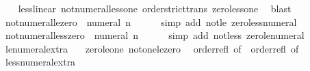\begin{isabellebody}
%
\isadelimproof
\ \ %
\endisadelimproof
%
\isatagproof
{}\isamarkupfalse%
\ less{\isacharunderscore}{\kern0pt}linear\ not{\isacharunderscore}{\kern0pt}numeral{\isacharunderscore}{\kern0pt}less{\isacharunderscore}{\kern0pt}one\ order{\isachardot}{\kern0pt}strict{\isacharunderscore}{\kern0pt}trans\ zero{\isacharunderscore}{\kern0pt}less{\isacharunderscore}{\kern0pt}one\ \isamarkupfalse%
\ blast%
\endisatagproof
{\isafoldproof}%
%
\isadelimproof
\isanewline
%
\endisadelimproof
\isanewline
{}\isamarkupfalse%
\ not{\isacharunderscore}{\kern0pt}numeral{\isacharunderscore}{\kern0pt}le{\isacharunderscore}{\kern0pt}zero{\isacharcolon}{\kern0pt}\ {\isachardoublequoteopen}{\isasymnot}\ numeral\ n\ {\isasymle}\ {}{\isachardoublequoteclose}\isanewline
%
\isadelimproof
\ \ %
\endisadelimproof
%
\isatagproof
{}\isamarkupfalse%
\ {\isacharparenleft}{\kern0pt}simp\ add{\isacharcolon}{\kern0pt}\ not{\isacharunderscore}{\kern0pt}le\ zero{\isacharunderscore}{\kern0pt}less{\isacharunderscore}{\kern0pt}numeral{\isacharparenright}{\kern0pt}%
\endisatagproof
{\isafoldproof}%
%
\isadelimproof
\isanewline
%
\endisadelimproof
\isanewline
{}\isamarkupfalse%
\ not{\isacharunderscore}{\kern0pt}numeral{\isacharunderscore}{\kern0pt}less{\isacharunderscore}{\kern0pt}zero{\isacharcolon}{\kern0pt}\ {\isachardoublequoteopen}{\isasymnot}\ numeral\ n\ {\isacharless}{\kern0pt}\ {}{\isachardoublequoteclose}\isanewline
%
\isadelimproof
\ \ %
\endisadelimproof
%
\isatagproof
{}\isamarkupfalse%
\ {\isacharparenleft}{\kern0pt}simp\ add{\isacharcolon}{\kern0pt}\ not{\isacharunderscore}{\kern0pt}less\ zero{\isacharunderscore}{\kern0pt}le{\isacharunderscore}{\kern0pt}numeral{\isacharparenright}{\kern0pt}%
\endisatagproof
{\isafoldproof}%
%
\isadelimproof
\isanewline
%
\endisadelimproof
\isanewline
{}\isamarkupfalse%
\ le{\isacharunderscore}{\kern0pt}numeral{\isacharunderscore}{\kern0pt}extra\ {\isacharequal}{\kern0pt}\isanewline
\ \ zero{\isacharunderscore}{\kern0pt}le{\isacharunderscore}{\kern0pt}one\ not{\isacharunderscore}{\kern0pt}one{\isacharunderscore}{\kern0pt}le{\isacharunderscore}{\kern0pt}zero\isanewline
\ \ order{\isacharunderscore}{\kern0pt}refl\ {\isacharbrackleft}{\kern0pt}of\ {}{\isacharbrackright}{\kern0pt}\ order{\isacharunderscore}{\kern0pt}refl\ {\isacharbrackleft}{\kern0pt}of\ {}{\isacharbrackright}{\kern0pt}\isanewline
\isanewline
{}\isamarkupfalse%
\ less{\isacharunderscore}{\kern0pt}numeral{\isacharunderscore}{\kern0pt}extra\ {\isacharequal}{\kern0pt}\isanewline

\end{isabellebody}
